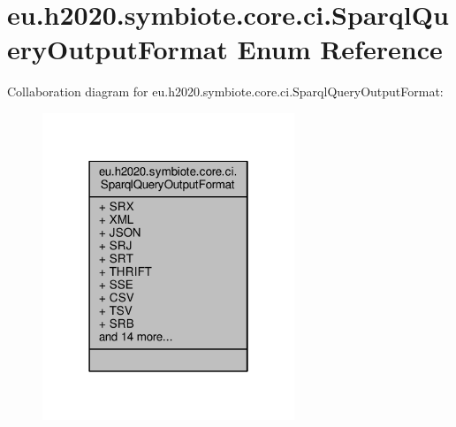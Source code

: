 \hypertarget{enumeu_1_1h2020_1_1symbiote_1_1core_1_1ci_1_1SparqlQueryOutputFormat}{}\section{eu.\+h2020.\+symbiote.\+core.\+ci.\+Sparql\+Query\+Output\+Format Enum Reference}
\label{enumeu_1_1h2020_1_1symbiote_1_1core_1_1ci_1_1SparqlQueryOutputFormat}


Collaboration diagram for eu.\+h2020.\+symbiote.\+core.\+ci.\+Sparql\+Query\+Output\+Format\+:\nopagebreak
\begin{figure}[H]
\begin{center}
\leavevmode
\includegraphics[width=214pt]{enumeu_1_1h2020_1_1symbiote_1_1core_1_1ci_1_1SparqlQueryOutputFormat__coll__graph}
\end{center}
\end{figure}
